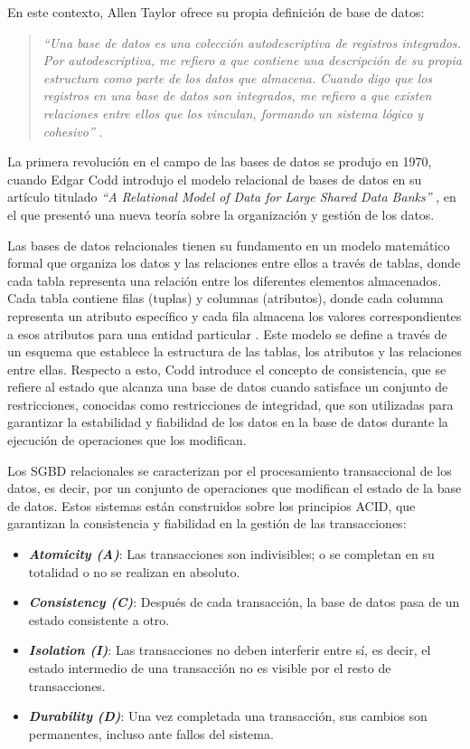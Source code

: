 En este contexto, Allen Taylor ofrece su propia definición de base de datos:

\begin{quote}
    \textit{“Una base de datos es una colección autodescriptiva de registros integrados. Por autodescriptiva, me refiero a que contiene una descripción de su propia estructura como parte de los datos que almacena. Cuando digo que los registros en una base de datos son integrados, me refiero a que existen relaciones entre ellos que los vinculan, formando un sistema lógico y cohesivo”} \cite{Taylor2001}.
\end{quote}

La primera revolución en el campo de las bases de datos se produjo en 1970, cuando Edgar Codd 
introdujo el modelo relacional de bases de datos en su artículo 
titulado \textit{“A Relational Model of Data for Large Shared Data Banks”} \cite{Codd1970}, 
en el que presentó una nueva teoría sobre la organización y gestión de los datos.

Las bases de datos relacionales tienen su fundamento en un modelo matemático formal que organiza 
los datos y las relaciones entre ellos a través de tablas, donde cada tabla representa 
una relación entre los diferentes elementos almacenados. Cada tabla contiene filas 
(tuplas) y columnas (atributos), donde cada columna representa un atributo específico y 
cada fila almacena los valores correspondientes a esos atributos para una entidad 
particular \cite{Chen2016}. Este modelo se define a través de un esquema que establece 
la estructura de las tablas, los atributos y las relaciones entre ellas. 
Respecto a esto, Codd introduce el concepto de consistencia, que se refiere al 
estado que alcanza una base de datos cuando satisface un conjunto de restricciones, 
conocidas como restricciones de integridad, que son utilizadas para garantizar la 
estabilidad y fiabilidad de los datos en la base de datos durante la ejecución de 
operaciones que los modifican.

Los SGBD relacionales se caracterizan por el procesamiento transaccional de los datos, 
es decir, por un conjunto de operaciones que modifican el estado de la base de datos. 
Estos sistemas están construidos sobre los principios ACID, que garantizan la 
consistencia y fiabilidad en la gestión de las transacciones:

\begin{itemize}
    \item \textbf{\textit{Atomicity (A)}}: Las transacciones son indivisibles; o se completan 
    en su totalidad o no se realizan en absoluto.
    \item \textbf{\textit{Consistency (C)}}: Después de cada transacción, la base de datos 
    pasa de un estado consistente a otro.
    \item \textbf{\textit{Isolation (I)}}: Las transacciones no deben interferir entre sí, 
    es decir, el estado intermedio de una transacción no es visible por el resto de 
    transacciones.
    \item \textbf{\textit{Durability (D)}}: Una vez completada una transacción, sus cambios 
    son permanentes, incluso ante fallos del sistema.
\end{itemize}

